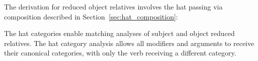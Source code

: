 \begin{center}
\end{center}

The derivation for reduced object relatives involves the hat passing via
composition described in Section~\ref{sec:hat_composition}:

\begin{center}
\end{center}

The hat categories enable matching analyses of subject and object reduced relatives.
The hat category analysis allows all modifiers and arguments to receive their canonical
categories, with only the verb receiving a different category.

